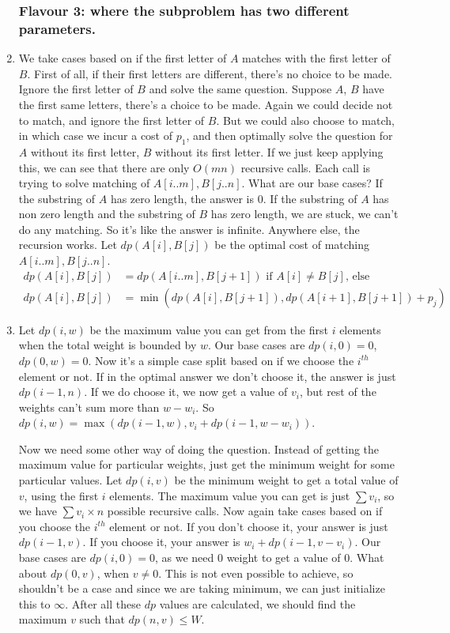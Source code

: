 \documentclass[12pt]{report}
\begin{document}
\begin{enumerate}[label=\textbf{\arabic*.}]
  \subsubsection*{Flavour 3: where the subproblem has two diﬀerent parameters.}

  \item We take cases based on if the first letter of $A$ matches with the first letter of $B$. First of all, if their first letters are different, there's no choice to be made. Ignore the first letter of $B$ and
  solve the same question. Suppose $A$, $B$ have the first same letters, there's a choice to be made. Again we could decide not to match, and ignore the first letter of $B$. But we could also choose to match, in 
  which case we incur a cost of $p_1$, and then optimally solve the question for $A$ without its first letter, $B$ without its first letter. If we just keep applying this, we can see that there are only $O(mn)$ 
  recursive calls. Each call is trying to solve matching of $A[i .. m], B[j .. n]$. What are our base cases? If the substring of $A$ has zero length, the answer is $0$. If the substring of $A$ has non zero length
  and the substring of $B$ has zero length, we are stuck, we can't do any matching. So it's like the answer is infinite. Anywhere else, the recursion works. Let $dp(A[i], B[j])$ be the optimal cost of matching 
  $A[i..m], B[j..n]$.
  \begin{align*}
    dp(A[i], B[j]) &= dp(A[i .. m], B[j+1]) \text{ if } A[i] \neq B[j] \text{, else} \\
    dp(A[i], B[j]) &= \min(dp(A[i], B[j+1]), dp(A[i+1], B[j+1]) + p_j)
  \end{align*}
  

  \item Let $dp(i, w)$ be the maximum value you can get from the first $i$ elements when the total weight is bounded by $w$. Our base cases are $dp(i, 0) = 0$, $dp(0, w) = 0$. Now it's a simple case split based
  on if we choose the $i^{th}$ element or not. If in the optimal answer we don't choose it, the answer is just $dp(i-1, n)$. If we do choose it, we now get a value of $v_i$, but rest of the weights can't sum more
  than $w - w_i$. So $dp(i,w) = \max(dp(i-1,w), v_i + dp(i-1, w - w_i))$.

  Now we need some other way of doing the question. Instead of getting the maximum value for particular weights, just get the minimum weight for some particular values. Let $dp(i, v)$ be the minimum weight to get a
  total value of $v$, using the first $i$ elements. The maximum value you can get is just $\sum v_i$, so we have $\sum v_i \times n$ possible recursive calls. Now again take cases based on if you choose the $i^{th}$ 
  element or not. If you don't choose it, your answer is just $dp(i-1, v)$. If you choose it, your answer is $w_i + dp(i-1, v - v_i)$. Our base cases are $dp(i,0) = 0$, as we need 0 weight to get a value of $0$. What
  about $dp(0,v)$, when $v \neq 0$. This is not even possible to achieve, so shouldn't be a case and since we are taking minimum, we can just initialize this to $\infty$. After all these $dp$ values are calculated,
  we should find the maximum $v$ such that $dp(n,v) \leq W$.


\end{enumerate}
\end{document}
